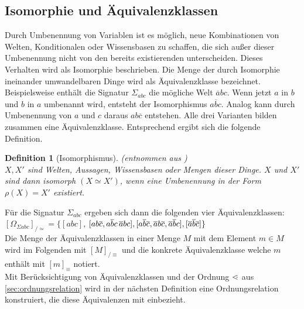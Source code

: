 \documentclass[12pt,a4paper]{article}
\newtheorem{theorem}{Definition}
\newcommand\dotl{\mathrel{%
    \mathchoice{\QEQ}{\QEQ}{\QEQ}{\QEQ}%
}}
\def\QEQ{{%
    \setbox0\hbox{<}%
    \rlap{\hbox to \wd0{\hss \raisebox {0.1pt}{$\ \cdot$\hss}}}\box0
}}
\begin{document}
\subsection{Isomorphie und Äquivalenzklassen}
\label{sec:äquivalenz-wissensbasen}
Durch Umbenennung von Variablen ist es möglich, neue Kombinationen von Welten, Konditionalen oder Wissensbasen zu schaffen, die sich außer dieser Umbenennung nicht von den bereits existierenden unterscheiden. Dieses Verhalten wird als Isomorphie beschrieben. Die Menge der durch Isomorphie ineinander umwandelbaren Dinge wird als Äquivalenzklasse bezeichnet. \\
Beispielsweise enthält die Signatur $\Sigma_{abc}$ die mögliche Welt $\overline{a}bc$. Wenn jetzt $a$ in $b$ und $b$ in $a$ umbenannt wird, entsteht der Isomorphismus $a\overline{b}c$. Analog kann durch Umbenennung von $a$ und $c$ daraus $ab\overline{c}$ entstehen. Alle drei Varianten bilden zusammen eine Äquivalenzklasse. Entsprechend ergibt sich die folgende Definition.
\begin{theorem}[Isomorphismus](entnommen aus \cite{beierle19}) \ \\
$X, X'$ sind Welten, Aussagen, Wissensbasen oder Mengen dieser Dinge. $X$ und $X'$ sind dann isomorph $(X \simeq X')$, wenn eine Umbenennung in der Form $\rho(X) = X'$ existiert.
\end{theorem}
Für die Signatur $\Sigma_{abc}$ ergeben sich dann die folgenden vier Äquivalenzklassen: \\
$[\Omega_{\Sigma abc}]_{/\simeq}=\{[abc]$, $[ab\overline{c}, a\overline{b}c\, \overline{a}bc], [a\overline{b}\overline{c}, \overline{a\\}b\overline{c}, \overline{a}\overline{b}c], [\overline{a}\overline{b}\overline{c}]\}$ \\
Die Menge der Äquivalenzklassen in einer Menge $M$ mit dem Element $m \in M$ wird im Folgenden mit $[M]_{/\equiv}$ und die konkrete Äquivalenzklasse welche $m$ enthält mit $[m]_\equiv$ notiert.\\
Mit Berücksichtigung von Äquivalenzklassen und der Ordnung $\dotl$ aus \autoref{sec:ordnungsrelation} wird in der nächsten Definition eine Ordnungsrelation konstruiert, die diese Äquivalenzen mit einbezieht.
\end{document}
